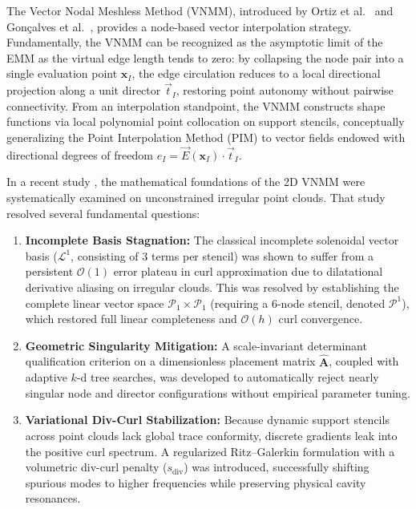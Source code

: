\documentclass[preprint,12pt]{elsarticle}
\begin{document}
The Vector Nodal Meshless Method (VNMM), introduced by Ortiz et al.~\cite{ortiz2021nodal, ortiz2023tese} and Gonçalves et al.~\cite{goncalves2023vector, goncalves2025tese}, provides a node-based vector interpolation strategy. Fundamentally, the VNMM can be recognized as the asymptotic limit of the EMM as the virtual edge length tends to zero: by collapsing the node pair into a single evaluation point $\mathbf{x}_I$, the edge circulation reduces to a local directional projection along a unit director $\vec{t}_I$, restoring point autonomy without pairwise connectivity. From an interpolation standpoint, the VNMM constructs shape functions via local polynomial point collocation on support stencils, conceptually generalizing the Point Interpolation Method (PIM) \cite{liu2001point, liu2005introduction} to vector fields endowed with directional degrees of freedom $e_I = \vec{E}(\mathbf{x}_I) \cdot \vec{t}_I$.

In a recent study \cite{stable_vnmm2d_2026}, the mathematical foundations of the 2D VNMM were systematically examined on unconstrained irregular point clouds. That study resolved several fundamental questions:
\begin{enumerate}
    \item \textbf{Incomplete Basis Stagnation:} The classical incomplete solenoidal vector basis ($\mathcal{L}^1$, consisting of 3 terms per stencil) was shown to suffer from a persistent $\mathcal{O}(1)$ error plateau in curl approximation due to dilatational derivative aliasing on irregular clouds. This was resolved by establishing the complete linear vector space $\mathcal{P}_1 \times \mathcal{P}_1$ (requiring a 6-node stencil, denoted $\mathcal{P}^1$), which restored full linear completeness and $\mathcal{O}(h)$ curl convergence.
    \item \textbf{Geometric Singularity Mitigation:} A scale-invariant determinant qualification criterion on a dimensionless placement matrix $\widehat{\mathbf{A}}$, coupled with adaptive $k$-d tree searches, was developed to automatically reject nearly singular node and director configurations without empirical parameter tuning.
    \item \textbf{Variational Div-Curl Stabilization:} Because dynamic support stencils across point clouds lack global trace conformity, discrete gradients leak into the positive curl spectrum. A regularized Ritz--Galerkin formulation with a volumetric div-curl penalty ($s_{\mathrm{div}}$) was introduced, successfully shifting spurious modes to higher frequencies while preserving physical cavity resonances.
\end{enumerate}
\end{document}

